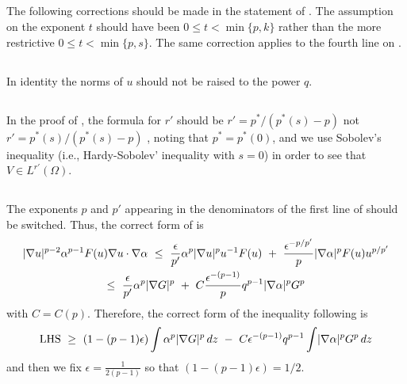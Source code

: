 \documentclass[10pt]{amsart}
\begin{document}
\subsection{} The following corrections should be made in the statement of \cite[Theorem 2.1)]{V11}.  The assumption on the exponent $t$ should have been $0\leq t<\min \{p,k\}$ rather than the more restrictive $0\leq t<\min \{p,s\}$. The same correction applies to the fourth line on \cite[p.41]{V11}.

\subsection{} In identity \cite[(2.21)]{V11} the norms of $u$ should not be raised to the power $q$.

\subsection{} In the proof of \cite[Theorem 2.4)]{V11}, the formula for $r'$ should be $r'=p^*/(p^*(s)-p)$ not $r'=p^*(s)/(p^*(s)-p)$ , noting that $p^*=p^*(0)$, and we use Sobolev's inequality (i.e., Hardy-Sobolev' inequality with $s=0$) in order to see that $V\in L^{r'}(\Omega)$.

\subsection{}  The exponents $p$ and $p'$ appearing in the denominators of the first line of \cite[(2.51)]{V11} should be switched. Thus, the correct form of \cite[(2.51)]{V11} is
\begin{multline}\label{e:holder}
\lvert \nabla u \rvert^{p-2}\alpha^{p-1} F(u)\nabla u \cdot \nabla \alpha\
\leq\ \frac {\epsilon }{p'}\alpha^p\lvert \nabla u \rvert^p u^{-1} F(u)\ +\
\frac {\epsilon^{-p/p'}}{p}
\lvert \nabla\alpha \rvert^p F(u)u^{p/{p'}}\\
\leq\ \frac {\epsilon }{p'} \alpha^p \lvert \nabla G \rvert^p \ +\
C\frac {\epsilon^{-(p-1)}}{p} q^{p-1} \lvert \nabla \alpha \rvert^p G^p
\end{multline}
with $C=C(p)$. Therefore, the correct form of the inequality following \cite[(2.51)]{V11} is
\[
\text{LHS}\ \geq\ (1-(p-1)\epsilon)\int \alpha^p \lvert \nabla G \rvert^p\, dz \
-\ C\epsilon^{-(p-1)}q^{p-1}\int \lvert \nabla \alpha \rvert^p G^p\, dz
\]
and then we fix $\epsilon=\frac {1}{2(p-1)}$ so that $(1-(p-1)\epsilon)=1/2$.

\subsection{}\label{ss:add assumption} %
\end{document}
